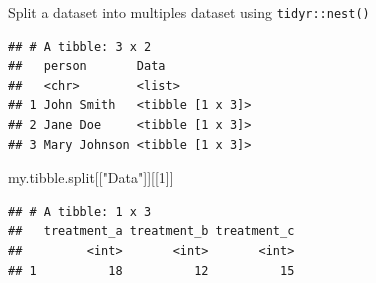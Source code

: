 \documentclass[14pt,ignorenonframetext,]{bredelebeamer}
\newenvironment{Shaded}{\begin{snugshade}}{\end{snugshade}}
\newcommand{\KeywordTok}[1]{\textcolor[rgb]{0.94,0.87,0.69}{#1}}
\newcommand{\DataTypeTok}[1]{\textcolor[rgb]{0.87,0.87,0.75}{#1}}
\newcommand{\DecValTok}[1]{\textcolor[rgb]{0.86,0.86,0.80}{#1}}
\newcommand{\StringTok}[1]{\textcolor[rgb]{0.80,0.58,0.58}{#1}}
\newcommand{\OperatorTok}[1]{\textcolor[rgb]{0.94,0.94,0.82}{#1}}
\newcommand{\NormalTok}[1]{\textcolor[rgb]{0.80,0.80,0.80}{#1}}
\begin{document}
\begin{frame}[fragile]{Split a dataset into multiples dataset using
\texttt{tidyr::nest()}}

\begin{Shaded}
\end{Shaded}

\begin{verbatim}
## # A tibble: 3 x 2
##   person       Data            
##   <chr>        <list>          
## 1 John Smith   <tibble [1 x 3]>
## 2 Jane Doe     <tibble [1 x 3]>
## 3 Mary Johnson <tibble [1 x 3]>
\end{verbatim}

\begin{Shaded}
\begin{Highlighting}[]
\NormalTok{my.tibble.split[[}\StringTok{"Data"}\NormalTok{]][[}\DecValTok{1}\NormalTok{]]}
\end{Highlighting}
\end{Shaded}

\begin{verbatim}
## # A tibble: 1 x 3
##   treatment_a treatment_b treatment_c
##         <int>       <int>       <int>
## 1          18          12          15
\end{verbatim}

\end{frame}
\end{document}
